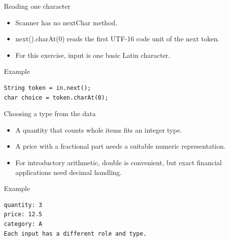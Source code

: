 \documentclass[10pt,aspectratio=169]{beamer}
\begin{document}
\begin{frame}[fragile,t]{Reading one character}
\begin{itemize}
\item Scanner has no nextChar method.
\item next().charAt(0) reads the first UTF-16 code unit of the next token.
\item For this exercise, input is one basic Latin character.
\end{itemize}
\vspace{1mm}\begin{block}{Example}
\begin{lstlisting}
String token = in.next();
char choice = token.charAt(0);
\end{lstlisting}
\end{block}
\end{frame}

\begin{frame}[fragile,t]{Choosing a type from the data}
\begin{itemize}
\item A quantity that counts whole items fits an integer type.
\item A price with a fractional part needs a suitable numeric representation.
\item For introductory arithmetic, double is convenient, but exact financial applications need decimal handling.
\end{itemize}
\vspace{1mm}\begin{block}{Example}
\begin{lstlisting}
quantity: 3
price: 12.5
category: A
Each input has a different role and type.
\end{lstlisting}
\end{block}
\end{frame}
\end{document}
